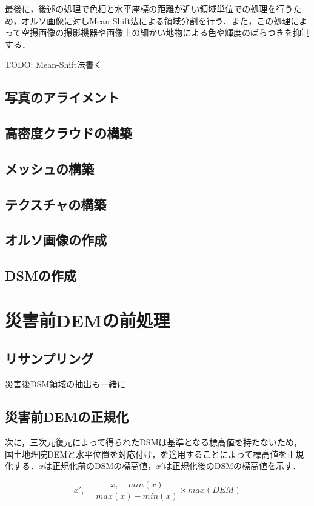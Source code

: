     最後に，後述の処理で色相と水平座標の距離が近い領域単位での処理を行うため，オルソ画像に対しMean-Shift法\cite{論文手法2}による領域分割を行う．また，この処理によって空撮画像の撮影機器や画像上の細かい地物による色や輝度のばらつきを抑制する．

    TODO: Mean-Shift法書く


    \subsection{写真のアライメント}
    \subsection{高密度クラウドの構築}
    \subsection{メッシュの構築}
    \subsection{テクスチャの構築}
    \subsection{オルソ画像の作成}
      \label{オルソ画像}
    \subsection{DSMの作成}




  \section{災害前DEMの前処理}
    \subsection{リサンプリング}
      災害後DSM領域の抽出も一緒に

    \subsection{災害前DEMの正規化}
      次に，三次元復元によって得られたDSMは基準となる標高値を持たないため，国土地理院DEMと水平位置を対応付け，を適用することによって標高値を正規化する．$x$は正規化前のDSMの標高値，$x'$は正規化後のDSMの標高値を示す．

      \begin{equation}
        \label{正規化}
        x'_{i} = \dfrac{x_{i} - min(x)} {max(x) - min(x)} \times max(DEM) 
      \end{equation}
  
